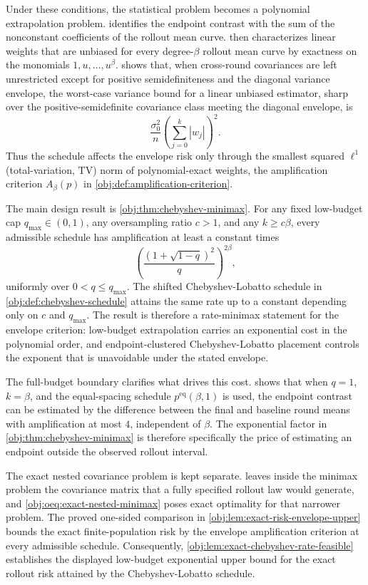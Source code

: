 Under these conditions, the statistical problem becomes a polynomial extrapolation problem.  identifies the endpoint contrast with the sum of the nonconstant coefficients of the rollout mean curve.  then characterizes linear weights that are unbiased for every degree-\(\beta\) rollout mean curve by exactness on the monomials \(1,u,\ldots,u^\beta\).  shows that, when cross-round covariances are left unrestricted except for positive semidefiniteness and the diagonal variance envelope, the worst-case variance bound for a linear unbiased estimator, sharp over the positive-semidefinite covariance class meeting the diagonal envelope, is
\[
\frac{\sigma_0^2}{n}\left(\sum_{j=0}^k |w_j|\right)^2.
\]
Thus the schedule affects the envelope risk only through the smallest squared \(\ell^1\) (total-variation, TV) norm of polynomial-exact weights, the amplification criterion \(A_\beta(p)\) in \cref{obj:def:amplification-criterion}.

The main design result is \cref{obj:thm:chebyshev-minimax}. For any fixed low-budget cap \(q_{\max}\in(0,1)\), any oversampling ratio \(c>1\), and any \(k\ge c\beta\), every admissible schedule has amplification at least a constant times
\[
\left(\frac{(1+\sqrt{1-q})^2}{q}\right)^{2\beta},
\]
uniformly over \(0<q\le q_{\max}\). The shifted Chebyshev-Lobatto schedule in \cref{obj:def:chebyshev-schedule} attains the same rate up to a constant depending only on \(c\) and \(q_{\max}\). The result is therefore a rate-minimax statement for the envelope criterion: low-budget extrapolation carries an exponential cost in the polynomial order, and endpoint-clustered Chebyshev-Lobatto placement controls the exponent that is unavoidable under the stated envelope.

The full-budget boundary clarifies what drives this cost.  shows that when \(q=1\), \(k=\beta\), and the equal-spacing schedule \(p^{\mathrm{eq}}(\beta,1)\) is used, the endpoint contrast can be estimated by the difference between the final and baseline round means with amplification at most \(4\), independent of \(\beta\). The exponential factor in \cref{obj:thm:chebyshev-minimax} is therefore specifically the price of estimating an endpoint outside the observed rollout interval.

The exact nested covariance problem is kept separate.  leaves inside the minimax problem the covariance matrix that a fully specified rollout law would generate, and \cref{obj:oeq:exact-nested-minimax} poses exact optimality for that narrower problem. The proved one-sided comparison in \cref{obj:lem:exact-risk-envelope-upper} bounds the exact finite-population risk by the envelope amplification criterion at every admissible schedule. Consequently, \cref{obj:lem:exact-chebyshev-rate-feasible} establishes the displayed low-budget exponential upper bound for the exact rollout risk attained by the Chebyshev-Lobatto schedule.

